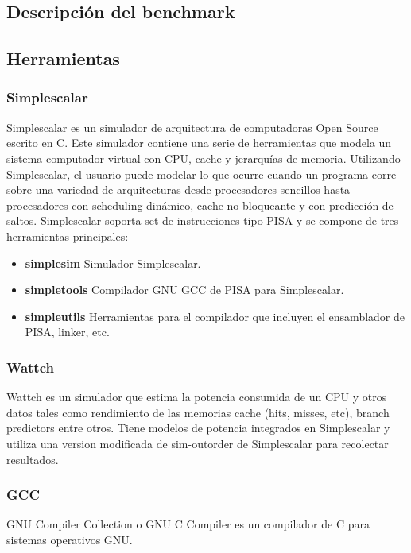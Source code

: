 \documentclass[journal]{IEEEtran}
\begin{document}
\subsection{Descripci\'{o}n del benchmark}


\subsection{Herramientas}

\subsubsection{Simplescalar}
Simplescalar\cite{SIMPLESCALAR} es un simulador de arquitectura de computadoras Open Source escrito en C. Este simulador contiene una serie de herramientas que modela un sistema computador virtual con CPU, cache y jerarqu\'{i}as de memoria.
Utilizando Simplescalar, el usuario puede modelar lo que ocurre cuando un programa corre sobre una variedad de arquitecturas desde procesadores sencillos hasta procesadores con scheduling din\'{a}mico, cache no-bloqueante
y con predicci\'{o}n de saltos. Simplescalar soporta set de instrucciones tipo PISA y se compone de tres herramientas principales: \newline

\begin{itemize}
\item \textbf{simplesim} Simulador Simplescalar.
\item \textbf{simpletools} Compilador GNU GCC de PISA para Simplescalar.
\item \textbf{simpleutils} Herramientas para el compilador que incluyen el ensamblador de PISA, linker, etc. \newline
\end{itemize}

\subsubsection{Wattch}
Wattch\cite{WATTCH} es un simulador que estima la potencia consumida de un CPU y otros datos tales como rendimiento de las memorias cache (hits, misses, etc), branch predictors entre otros. Tiene modelos de potencia integrados en Simplescalar y utiliza una version modificada de sim-outorder de Simplescalar para recolectar resultados. \newline

\subsubsection{GCC}
GNU Compiler Collection o GNU C Compiler es un compilador de C para sistemas operativos GNU. \newline
\end{document}
